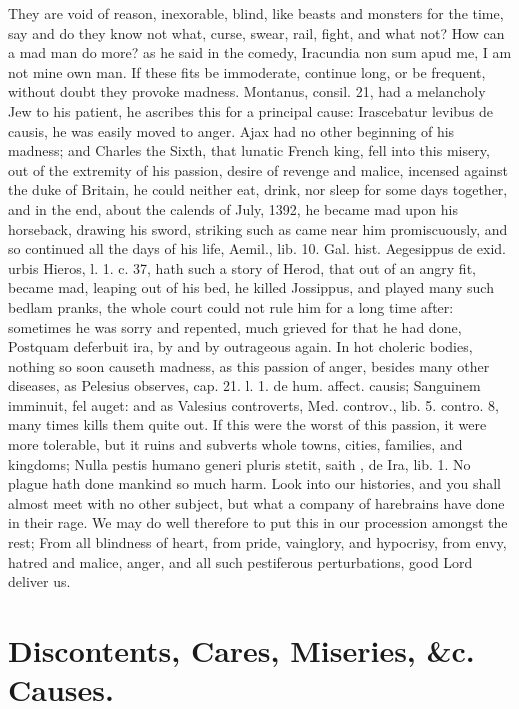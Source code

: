 {They are void of reason, inexorable, blind, like beasts and monsters
for the time, say and do they know not what, curse, swear, rail, fight,
and what not? How can a mad man do more? as he said in the comedy,
 Iracundia non sum apud me, I am not mine own man. If these fits
be immoderate, continue long, or be frequent, without doubt they
provoke madness. Montanus, consil. 21, had a melancholy Jew to his
patient, he ascribes this for a principal cause: Irascebatur levibus de
causis, he was easily moved to anger. Ajax had no other beginning of
his madness; and Charles the Sixth, that lunatic French king, fell into
this misery, out of the extremity of his passion, desire of revenge and
malice, incensed against the duke of Britain, he could neither
eat, drink, nor sleep for some days together, and in the end, about the
calends of July, 1392, he became mad upon his horseback, drawing his
sword, striking such as came near him promiscuously, and so continued
all the days of his life, Aemil., lib. 10. Gal. hist. Aegesippus de
exid. urbis Hieros, l. 1. c. 37, hath such a story of Herod, that out
of an angry fit, became mad, leaping out of his bed, he killed
Jossippus, and played many such bedlam pranks, the whole court could
not rule him for a long time after: sometimes he was sorry and
repented, much grieved for that he had done, Postquam deferbuit ira, by
and by outrageous again. In hot choleric bodies, nothing so soon
causeth madness, as this passion of anger, besides many other diseases,
as Pelesius observes, cap. 21. l. 1. de hum. affect. causis; Sanguinem
imminuit, fel auget: and as Valesius controverts, Med. controv.,
lib. 5. contro. 8, many times kills them quite out. If this were the
worst of this passion, it were more tolerable, but it ruins and
subverts whole towns, cities, families, and kingdoms; Nulla
pestis humano generi pluris stetit, saith \Seneca, de Ira, lib. 1. No
plague hath done mankind so much harm. Look into our histories, and you
shall almost meet with no other subject, but what a company of
harebrains have done in their rage. We may do well therefore to put
this in our procession amongst the rest; From all blindness of heart,
from pride, vainglory, and hypocrisy, from envy, hatred and malice,
anger, and all such pestiferous perturbations, good Lord deliver us.

\section{Discontents, Cares, Miseries, \&c. Causes.}

}
